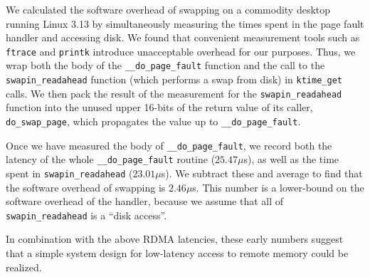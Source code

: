 We calculated the software overhead of swapping on a commodity desktop running Linux 3.13 by simultaneously measuring the times spent in the page fault handler and accessing disk. 
We found that convenient measurement tools such as \texttt{ftrace} and \texttt{printk} introduce unacceptable overhead for our purposes. 
Thus, we wrap both the body of the \texttt{\_\_do\_page\_fault} function and the call to the \texttt{swapin\_readahead} function (which performs a swap from disk) in \texttt{ktime\_get} calls.  
We then pack the result of the measurement for the \texttt{swapin\_readahead} function into the unused upper 16-bits of the return value of its caller, \texttt{do\_swap\_page}, which propagates the value up to \texttt{\_\_do\_page\_fault}. 

Once we have measured the body of \texttt{\_\_do\_page\_fault}, we record both the latency of the whole \texttt{\_\_do\_page\_fault} routine ($25.47 \mu$s), as well as the time spent in \texttt{swapin\_readahead} ($23.01 \mu$s). 
We subtract these and average to find that the software overhead of swapping is $2.46 \mu$s. 
This number is a lower-bound on the software overhead of the handler, because we assume that all of \texttt{swapin\_readahead} is a ``disk access''.%

In combination with the above RDMA latencies, these early numbers suggest that a simple system design for low-latency access to remote memory could be realized. 


